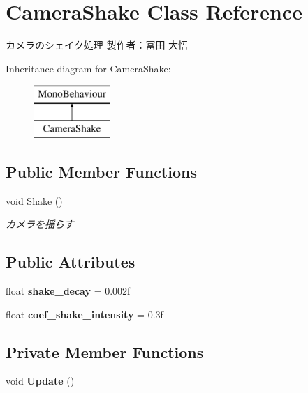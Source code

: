 \hypertarget{class_camera_shake}{}\section{Camera\+Shake Class Reference}
\label{class_camera_shake}


カメラのシェイク処理 製作者：冨田 大悟  


Inheritance diagram for Camera\+Shake\+:\begin{figure}[H]
\begin{center}
\leavevmode
\includegraphics[height=2.000000cm]{class_camera_shake}
\end{center}
\end{figure}
\subsection*{Public Member Functions}
\begin{DoxyCompactItemize}
\item 
void \hyperlink{class_camera_shake_a845c9b605bd8a8fcdf9ac5b14caa51b2}{Shake} ()
\begin{DoxyCompactList}\small\item\em カメラを揺らす \end{DoxyCompactList}\end{DoxyCompactItemize}
\subsection*{Public Attributes}
\begin{DoxyCompactItemize}
\item 
\mbox{\label{class_camera_shake_a223a23fa9161de0437e1b5ce95514bd6}} 
float {\bfseries shake\+\_\+decay} = 0.\+002f
\item 
\mbox{\label{class_camera_shake_a81b9c768e9dbe87fbbf75dcf239fbf7f}} 
float {\bfseries coef\+\_\+shake\+\_\+intensity} = 0.\+3f
\end{DoxyCompactItemize}
\subsection*{Private Member Functions}
\begin{DoxyCompactItemize}
\item 
\mbox{\label{class_camera_shake_afaa0c0499d12ffc02170faac24c718a6}} 
void {\bfseries Update} ()
\end{DoxyCompactItemize}
